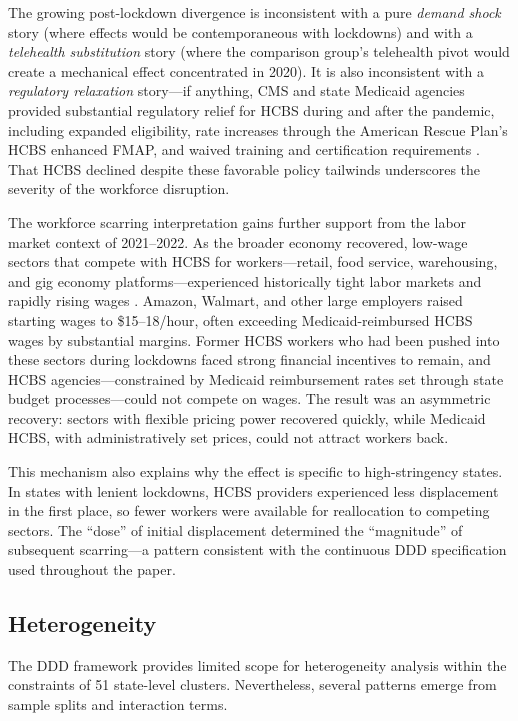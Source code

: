\documentclass[12pt]{article}
\begin{document}
The growing post-lockdown divergence is inconsistent with a pure \textit{demand shock} story (where effects would be contemporaneous with lockdowns) and with a \textit{telehealth substitution} story (where the comparison group's telehealth pivot would create a mechanical effect concentrated in 2020). It is also inconsistent with a \textit{regulatory relaxation} story---if anything, CMS and state Medicaid agencies provided substantial regulatory relief for HCBS during and after the pandemic, including expanded eligibility, rate increases through the American Rescue Plan's HCBS enhanced FMAP, and waived training and certification requirements \citep{wss2020}. That HCBS declined despite these favorable policy tailwinds underscores the severity of the workforce disruption.

The workforce scarring interpretation gains further support from the labor market context of 2021--2022. As the broader economy recovered, low-wage sectors that compete with HCBS for workers---retail, food service, warehousing, and gig economy platforms---experienced historically tight labor markets and rapidly rising wages \citep{autor2023compression}. Amazon, Walmart, and other large employers raised starting wages to \$15--18/hour, often exceeding Medicaid-reimbursed HCBS wages by substantial margins. Former HCBS workers who had been pushed into these sectors during lockdowns faced strong financial incentives to remain, and HCBS agencies---constrained by Medicaid reimbursement rates set through state budget processes---could not compete on wages. The result was an asymmetric recovery: sectors with flexible pricing power recovered quickly, while Medicaid HCBS, with administratively set prices, could not attract workers back.

This mechanism also explains why the effect is specific to high-stringency states. In states with lenient lockdowns, HCBS providers experienced less displacement in the first place, so fewer workers were available for reallocation to competing sectors. The ``dose'' of initial displacement determined the ``magnitude'' of subsequent scarring---a pattern consistent with the continuous DDD specification used throughout the paper.

\subsection{Heterogeneity}

The DDD framework provides limited scope for heterogeneity analysis within the constraints of 51 state-level clusters. Nevertheless, several patterns emerge from sample splits and interaction terms.
\end{document}
